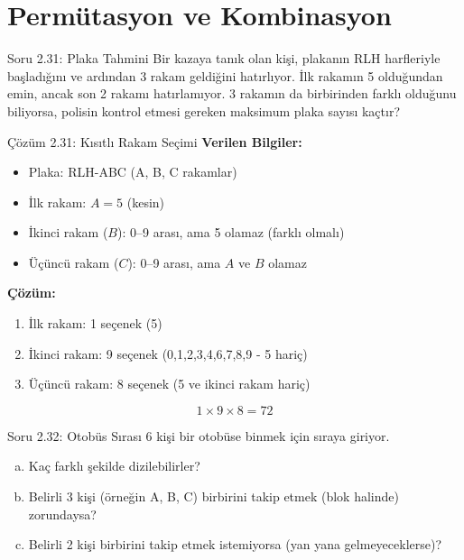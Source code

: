 \documentclass[light]{lutbeamer}
\begin{document}
\section{Permütasyon ve Kombinasyon}

\begin{frame}{Soru 2.31: Plaka Tahmini}
    \small
    Bir kazaya tanık olan kişi, plakanın RLH harfleriyle başladığını ve ardından 3 rakam geldiğini hatırlıyor. İlk rakamın 5 olduğundan emin, ancak son 2 rakamı hatırlamıyor. 3 rakamın da birbirinden farklı olduğunu biliyorsa, polisin kontrol etmesi gereken maksimum plaka sayısı kaçtır?
\end{frame}

\begin{frame}{Çözüm 2.31: Kısıtlı Rakam Seçimi}
    \color{blue}
    \textbf{Verilen Bilgiler:}
    \begin{itemize}
        \item Plaka: RLH-ABC (A, B, C rakamlar)
        \item İlk rakam: $A = 5$ (kesin)
        \item İkinci rakam ($B$): 0--9 arası, ama 5 olamaz (farklı olmalı)
        \item Üçüncü rakam ($C$): 0--9 arası, ama $A$ ve $B$ olamaz
    \end{itemize}
    
    \vspace{0.3cm}
    \textbf{Çözüm:}
    \begin{enumerate}
        \item İlk rakam: 1 seçenek (5)
        \item İkinci rakam: 9 seçenek (0,1,2,3,4,6,7,8,9 - 5 hariç)
        \item Üçüncü rakam: 8 seçenek (5 ve ikinci rakam hariç)
    \end{enumerate}
    
    \[ 1 \times 9 \times 8 = 72 \]
    
    \begin{center}
    \end{center}
\end{frame}

\begin{frame}{Soru 2.32: Otobüs Sırası}
    6 kişi bir otobüse binmek için sıraya giriyor.
    \begin{enumerate}[a)]
        \item Kaç farklı şekilde dizilebilirler?
        \item Belirli 3 kişi (örneğin A, B, C) birbirini takip etmek (blok halinde) zorundaysa?
        \item Belirli 2 kişi birbirini takip etmek istemiyorsa (yan yana gelmeyeceklerse)?
    \end{enumerate}
\end{frame}
\end{document}
